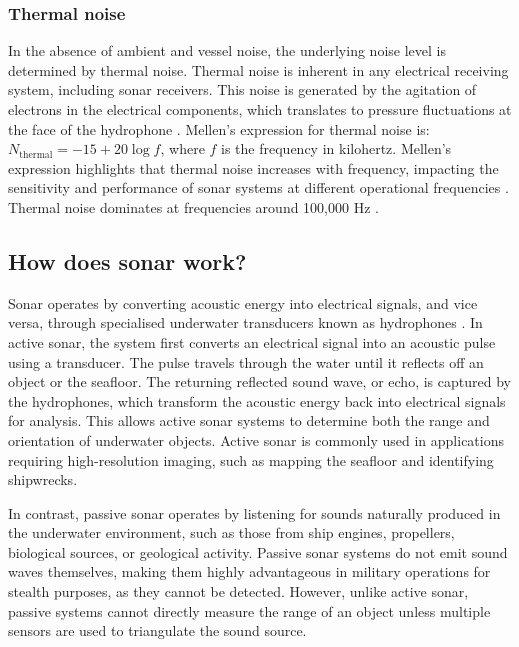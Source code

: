 \subsubsection{Thermal noise}
    In the absence of ambient and vessel noise, the underlying noise level is determined by thermal noise. Thermal noise is inherent in any electrical receiving system, including sonar receivers. This noise is generated by the agitation of electrons in the electrical components, which translates to pressure fluctuations at the face of the hydrophone \cite{waite_sonar_2002}. Mellen's expression for thermal noise is: $N_\text{thermal} = -15 + 20 \log f$, where $f$ is the frequency in kilohertz. Mellen's expression highlights that thermal noise increases with frequency, impacting the sensitivity and performance of sonar systems at different operational frequencies \cite{bjorno_applied_2017}. Thermal noise dominates at frequencies around 100,000 Hz \cite{dahl_underwater_2007}.

\subsection{How does sonar work?}\label{subsec:sonar-working}

Sonar operates by converting acoustic energy into electrical signals, and vice versa, through specialised underwater transducers known as hydrophones \cite{waite_sonar_2002, rodriguez_fundamentals_2023, abraham_underwater_2019}. In active sonar, the system first converts an electrical signal into an acoustic pulse using a transducer. The pulse travels through the water until it reflects off an object or the seafloor. The returning reflected sound wave, or echo, is captured by the hydrophones, which transform the acoustic energy back into electrical signals for analysis. This allows active sonar systems to determine both the range and orientation of underwater objects. Active sonar is commonly used in applications requiring high-resolution imaging, such as mapping the seafloor and identifying shipwrecks.

In contrast, passive sonar operates by listening for sounds naturally produced in the underwater environment, such as those from ship engines, propellers, biological sources, or geological activity. Passive sonar systems do not emit sound waves themselves, making them highly advantageous in military operations for stealth purposes, as they cannot be detected. However, unlike active sonar, passive systems cannot directly measure the range of an object unless multiple sensors are used to triangulate the sound source.

